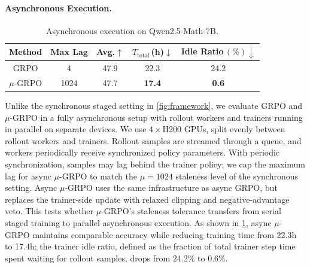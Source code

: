 \paragraph{Asynchronous Execution.}
\begin{table}
\vspace{-1.25em}
\centering
\setlength{\tabcolsep}{0.2cm}
\renewcommand{\arraystretch}{0.8}
\footnotesize
\caption{Asynchronous execution on Qwen2.5-Math-7B.}
\vspace{-0.6em}
\label{tab:async}
\begin{tabular}{ccccc}
\toprule
Method & Max Lag & Avg.$\uparrow$ & $T_{\mathrm{total}}$\,(h)$\downarrow$ & Idle Ratio$\,(\%)\downarrow$ \\
\midrule
GRPO & 4 & 47.9 & 22.3 & 24.2 \\
$\mu$-GRPO & 1024 & 47.7 & \textbf{17.4} & \textbf{0.6} \\
\bottomrule
\end{tabular}
\vspace{-1.2em}
\end{table}
Unlike the synchronous staged setting in \cref{fig:framework}, we evaluate GRPO and $\mu$-GRPO in a fully asynchronous setup with rollout workers and trainers running in parallel on separate devices. We use $4\times$H200 GPUs, split evenly between rollout workers and trainers. Rollout samples are streamed through a queue, and workers periodically receive synchronized policy parameters. With periodic synchronization, samples may lag behind the trainer policy; we cap the maximum lag for async $\mu$-GRPO to match the $\mu=1024$ staleness level of the synchronous setting. Async $\mu$-GRPO uses the same infrastructure as async GRPO, but replaces the trainer-side update with relaxed clipping and negative-advantage veto. This tests whether $\mu$-GRPO's staleness tolerance transfers from serial staged training to parallel asynchronous execution. As shown in \cref{tab:async}, async $\mu$-GRPO maintains comparable accuracy while reducing training time from 22.3h to 17.4h; the trainer idle ratio, defined as the fraction of total trainer step time spent waiting for rollout samples, drops from 24.2\% to 0.6\%. 
